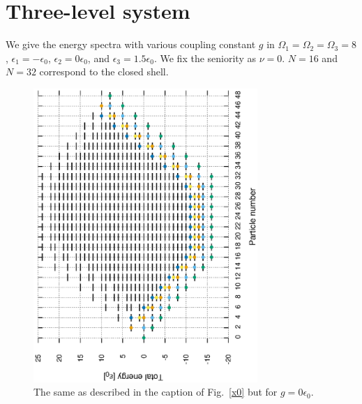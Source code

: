 \documentclass[11pt]{book} %
\begin{document}
\newpage

\section{Three-level system}
We give the energy spectra with various coupling constant $g$ in $\Omega_1=\Omega_2=\Omega_3=8$, $\epsilon_1=-\epsilon_0$, $\epsilon_2=0\epsilon_0$, and $\epsilon_3=1.5\epsilon_0$. We fix the seniority as $\nu=0$. $N=16$ and $N=32$ correspond to the closed shell.

\begin{figure}[htbp]
 \begin{center}
  \includegraphics[width=85mm,angle=-90]{images/spectra_g0.eps}
 \end{center}
 \caption{The same as described in the caption of Fig.~\ref{x0} but for $g=0\epsilon_0$.
	}
 \label{g0}
\end{figure}
\end{document}
